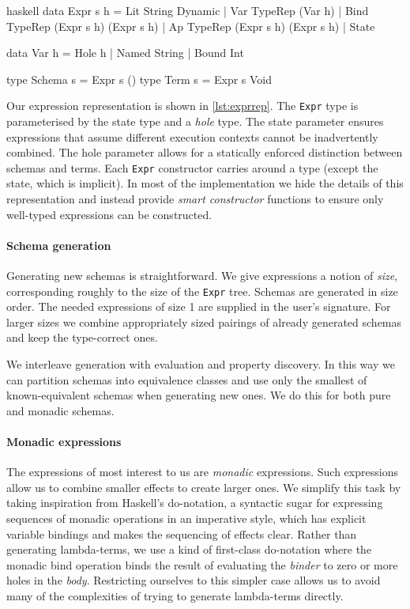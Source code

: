 \begin{listing}
\centering
\begin{cminted}{haskell}
data Expr s h
  = Lit  String Dynamic
  | Var  TypeRep (Var h)
  | Bind TypeRep (Expr s h) (Expr s h)
  | Ap   TypeRep (Expr s h) (Expr s h)
  | State

data Var h = Hole h | Named String | Bound Int

type Schema s = Expr s ()
type Term   s = Expr s Void
\end{cminted}
\caption{Representation of Haskell expressions.}
\label{lst:exprrep}
\end{listing}

Our expression representation is shown in \cref{lst:exprrep}.  The
\verb|Expr| type is parameterised by the state type and a \emph{hole}
type.  The state parameter ensures expressions that assume different
execution contexts cannot be inadvertently combined.  The hole
parameter allows for a statically enforced distinction between schemas
and terms.  Each \verb|Expr| constructor carries around a type (except
the state, which is implicit).  In most of the implementation we hide
the details of this representation and instead provide \emph{smart
  constructor} functions to ensure only well-typed expressions can be
constructed.

\paragraph{Schema generation}
Generating new schemas is straightforward.  We give expressions a
notion of \emph{size}, corresponding roughly to the size of the
\verb|Expr| tree.  Schemas are generated in size order.  The needed
expressions of size 1 are supplied in the user's signature.  For
larger sizes we combine appropriately sized pairings of already
generated schemas and keep the type-correct ones.

We interleave generation with evaluation and property discovery.  In
this way we can partition schemas into equivalence classes and use
only the smallest of known-equivalent schemas when generating new
ones.  We do this for both pure and monadic schemas.

\paragraph{Monadic expressions}
The expressions of most interest to us are \emph{monadic} expressions.
Such expressions allow us to combine smaller effects to create larger
ones.  We simplify this task by taking inspiration from Haskell's
do-notation, a syntactic sugar for expressing sequences of monadic
operations in an imperative style, which has explicit variable
bindings and makes the sequencing of effects clear.  Rather than
generating lambda-terms, we use a kind of first-class do-notation
where the monadic bind operation binds the result of evaluating the
\emph{binder} to zero or more holes in the \emph{body}.  Restricting
ourselves to this simpler case allows us to avoid many of the
complexities of trying to generate lambda-terms directly.

